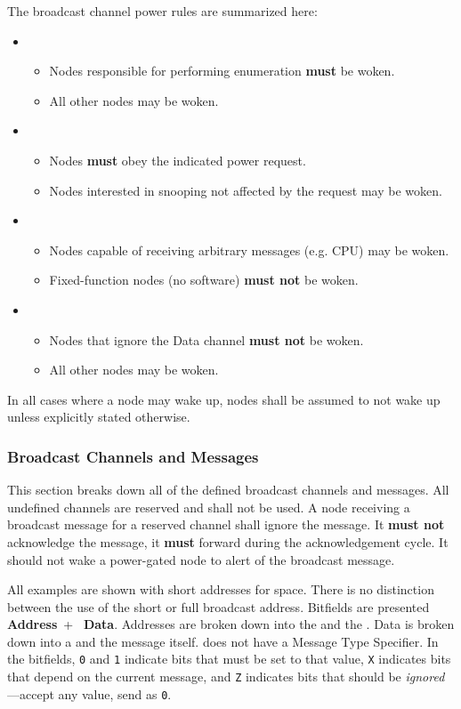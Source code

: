 \medskip\noindent
The \bus broadcast channel power rules are summarized here:
\begin{itemize}
  \item {}
  \begin{itemize}
    \item Nodes responsible for performing enumeration {\bf must} be woken.
    \item All other nodes may be woken.
  \end{itemize}
  \item {}
  \begin{itemize}
    \item Nodes {\bf must} obey the indicated power request.
    \item Nodes interested in snooping not affected by the request may be woken.
  \end{itemize}
  \item {}
  \begin{itemize}
    \item Nodes capable of receiving arbitrary messages (e.g. CPU) may be
             woken.
    \item Fixed-function nodes (no software) {\bf must not} be woken.
  \end{itemize}
  \item {}
  \begin{itemize}
    \item Nodes that ignore the Data channel {\bf must not} be woken.
    \item All other nodes may be woken.
  \end{itemize}
\end{itemize}
%
In all cases where a node may wake up, nodes shall be assumed to not wake up
unless explicitly stated otherwise.

\subsubsection{Broadcast Channels and Messages}
This section breaks down all of the defined broadcast channels and messages.
All undefined channels are reserved and shall not be used. A node receiving a
broadcast message for a reserved channel shall ignore the message. It {\bf
must not} acknowledge the message, it {\bf must} forward during the
acknowledgement cycle. It should not wake a power-gated node to alert of the
broadcast message.

All examples are shown with short addresses for space. There is no distinction
between the use of the short or full broadcast address.
Bitfields are presented \textbf{\color{blue} Address}~+~\textbf{\color{OliveGreen} Data}.
Addresses are broken down into the  and the
. Data is broken down into a
 and the message itself.
 does not have a Message Type Specifier.
%
In the bitfields,
{\tt 0} and {\tt 1} indicate bits that must be set to that value, {\tt X}
indicates bits that depend on the current message, and {\tt Z} indicates bits
that should be {\em ignored}---accept any value, send as {\tt 0}.

